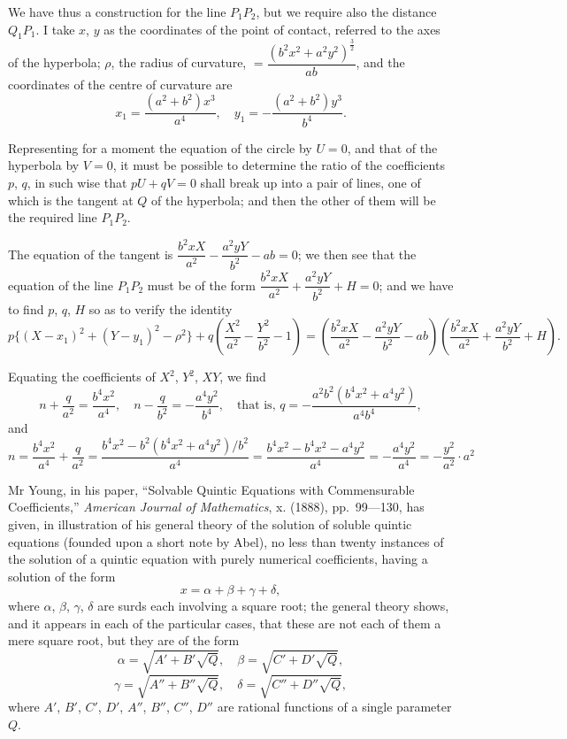 \documentclass[11pt,a4paper]{book}
\begin{document}
We have thus a construction for the line $P_1P_2$, but we require also the distance $Q_1P_1$. I take $x$, $y$ as the coordinates of the point of contact, referred to the axes of the hyperbola; $\rho$, the radius of curvature, $= \dfrac{(b^2x^2 + a^2y^2)^{\frac{3}{2}}}{ab}$, and the coordinates of the centre of curvature are
\[
x_1 = \frac{(a^2 + b^2)x^3}{a^4}, \quad y_1 = -\frac{(a^2 + b^2)y^3}{b^4}.
\]

Representing for a moment the equation of the circle by $U = 0$, and that of the hyperbola by $V = 0$, it must be possible to determine the ratio of the coefficients $p$, $q$, in such wise that $pU + qV = 0$ shall break up into a pair of lines, one of which is the tangent at $Q$ of the hyperbola; and then the other of them will be the required line $P_1P_2$.

The equation of the tangent is $\dfrac{b^2xX}{a^2} - \dfrac{a^2yY}{b^2} - ab = 0$; we then see that the equation of the line $P_1P_2$ must be of the form $\dfrac{b^2xX}{a^2} + \dfrac{a^2yY}{b^2} + H = 0$; and we have to find $p$, $q$, $H$ so as to verify the identity
\[
p\{(X - x_1)^2 + (Y - y_1)^2 - \rho^2\} + q\left(\frac{X^2}{a^2} - \frac{Y^2}{b^2} - 1\right) = \left(\frac{b^2xX}{a^2} - \frac{a^2yY}{b^2} - ab\right)\left(\frac{b^2xX}{a^2} + \frac{a^2yY}{b^2} + H\right).
\]

Equating the coefficients of $X^2$, $Y^2$, $XY$, we find
\[
n + \frac{q}{a^2} = \frac{b^4x^2}{a^4}, \quad n - \frac{q}{b^2} = -\frac{a^4y^2}{b^4}, \quad \text{that is, } q = -\frac{a^2b^2(b^4x^2 + a^4y^2)}{a^4b^4},
\]
and
\[
n = \frac{b^4x^2}{a^4} + \frac{q}{a^2} = \frac{b^4x^2 - b^2(b^4x^2 + a^4y^2)/b^2}{a^4} = \frac{b^4x^2 - b^4x^2 - a^4y^2}{a^4} = -\frac{a^4y^2}{a^4} = -\frac{y^2}{a^2} \cdot a^2
\]
\vspace{-2em}
\begin{flushright}
\end{flushright}

\newpage
{}

Mr Young, in his paper, ``Solvable Quintic Equations with Commensurable Coefficients,'' \textit{American Journal of Mathematics}, x. (1888), pp.~99---130, has given, in illustration of his general theory of the solution of soluble quintic equations (founded upon a short note by Abel), no less than twenty instances of the solution of a quintic equation with purely numerical coefficients, having a solution of the form
\[
x = \alpha + \beta + \gamma + \delta,
\]
where $\alpha$, $\beta$, $\gamma$, $\delta$ are surds each involving a square root; the general theory shows, and it appears in each of the particular cases, that these are not each of them a mere square root, but they are of the form
\[
\alpha = \sqrt{A' + B'\sqrt{Q}}, \quad \beta = \sqrt{C' + D'\sqrt{Q}},
\]
\[
\gamma = \sqrt{A'' + B''\sqrt{Q}}, \quad \delta = \sqrt{C'' + D''\sqrt{Q}},
\]
where $A'$, $B'$, $C'$, $D'$, $A''$, $B''$, $C''$, $D''$ are rational functions of a single parameter $Q$.
\end{document}
